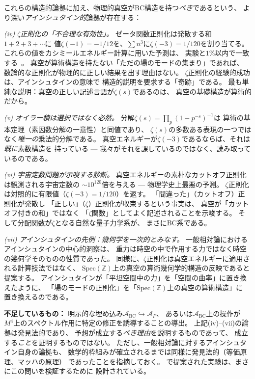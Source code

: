 \documentclass[11pt,a4paper]{article}
\newcommand{\Spec}{\mathrm{Spec}}
\begin{document}
これらの構造的論拠に加え、物理的真空がBC構造を持つ\emph{べき}であるという、
より深い\emph{アインシュタイン的}論拠が存在する：

\textit{(iv) $\zeta$正則化の「不合理な有効性」。}
ゼータ関数正則化は発散する和$1+2+3+\cdots$に
値$\zeta(-1) = -1/12$を、$\sum n^3$に$\zeta(-3) = 1/120$を割り当てる。
これらの値をカシミールエネルギー計算に用いた予測は、
実験と$1\%$以内で一致する~\cite{Lamoreaux1997}。
真空が算術構造を持たない「ただの場のモードの集まり」であれば、
数論的な正則化が物理的に正しい結果を出す理由はない。
$\zeta$正則化の経験的成功は、アインシュタインの意味で
構造的説明を要求する「奇跡」である。
最も単純な説明：真空の正しい記述言語が$\zeta(s)$であるのは、
真空の基礎構造が算術的だから。

\textit{(v) オイラー積は選択ではなく必然。}
分解$\zeta(s) = \prod_p(1-p^{-s})^{-1}$は
算術の基本定理（素因数分解の一意性）と同値であり、
$\zeta(s)$の多数ある表現の一つではなく\emph{唯一の}乗法的分解である。
真空エネルギーが$\zeta(-3)$であるならば、それは\emph{既に}素数構造を
持っている --- 我々がそれを課しているのではなく、読み取っているのである。

\textit{(vi) 宇宙定数問題が示唆する診断。}
真空エネルギーの素朴なカットオフ正則化は観測される宇宙定数の
$\sim 10^{120}$倍を与える --- 物理学史上最悪の予測。
$\zeta$正則化は対照的に有限値（$\zeta(-3) = 1/120$）を返す。
「間違った」（カットオフ）正則化が発散し
「正しい」（$\zeta$）正則化が収束するという事実は、
真空が「カットオフ付きの和」ではなく
「$\zeta$関数」としてよく記述されることを示唆する。
そして分配関数が$\zeta$となる自然な量子力学系が、
まさにBC系である。

\textit{(vii) アインシュタインの先例：幾何学を一次的とみなす。}
一般相対論におけるアインシュタインの中心的洞察は、
重力は時空の中で作用する力ではなく時空の幾何学そのものの性質であった。
同様に、$\zeta$正則化は真空エネルギーに適用される計算技法ではなく、
$\Spec(\mathbb{Z})$上の真空の算術幾何学的構造の反映であると提案する。
アインシュタインが「平坦空間中の力」を「空間の曲率」に置き換えたように、
「場のモードの正則化」を「$\Spec(\mathbb{Z})$上の真空の算術構造」に
置き換えるのである。

\textbf{不足しているもの：}
明示的な埋め込み$\mathcal{A}_{\mathrm{BC}} \hookrightarrow \mathcal{A}_F$、
あるいは$\mathcal{A}_{\mathrm{BC}}$上の操作が
$M^4$上のスペクトル作用に特定の修正を誘導することの導出。
上記(iv)--(vii)の論拠は発見法的であり、
予想が成立する\emph{べき理由}を説明するものであって、
成立する\emph{こと}を証明するものではない。
ただし、一般相対論に対するアインシュタイン自身の論拠も、
数学的枠組みが確立されるまでは同様に発見法的（等価原理、マッハの原理）
であったことを指摘しておく。
\cite{paper_A}で提案された実験は、まさにこの問いを検証するために
設計されている。
\end{document}
